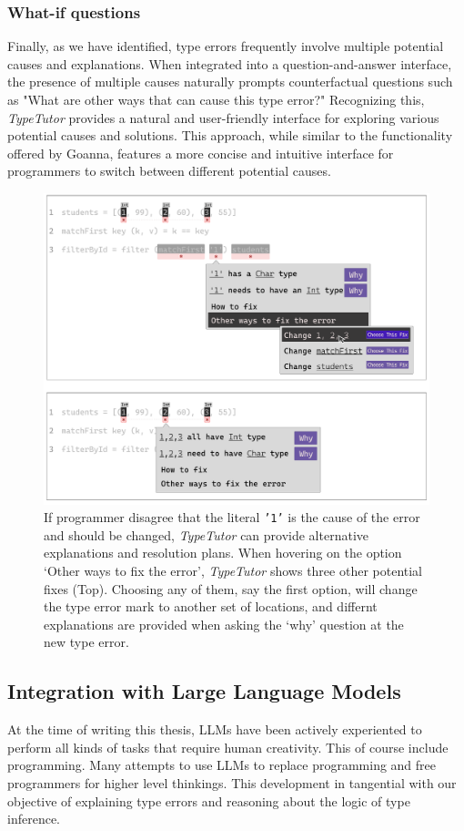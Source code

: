 \subsubsection{What-if questions}
Finally, as we have identified, type errors frequently involve multiple potential causes and explanations. When integrated into a question-and-answer interface, the presence of multiple causes naturally prompts counterfactual questions such as "What are other ways that can cause this type error?" Recognizing this, \textit{TypeTutor} provides a natural and user-friendly interface for exploring various potential causes and solutions. This approach, while similar to the functionality offered by Goanna, features a more concise and intuitive interface for programmers to switch between different potential causes.

\begin{figure}[hbt]
  \includegraphics[width=\linewidth]{WhatIf}
  \caption{
      If programmer disagree that the literal \texttt{'1'} is the cause of the error and should be changed, \textit{TypeTutor} can provide alternative explanations and resolution plans. When hovering on the option `Other ways to fix the error', \textit{TypeTutor} shows three other potential fixes (Top). Choosing any of them, say the first option, will change the type error mark to another set of locations, and differnt explanations are provided when asking the `why' question at the new type error.
    }
\end{figure}


\subsection{Integration with Large Language Models}
At the time of writing this thesis, LLMs have been actively experiented to perform all kinds of tasks that require human creativity. This of course include programming. Many attempts to use LLMs to replace programming and free programmers for higher level thinkings. This development in tangential with our objective of explaining type errors and reasoning about the logic of type inference. 


